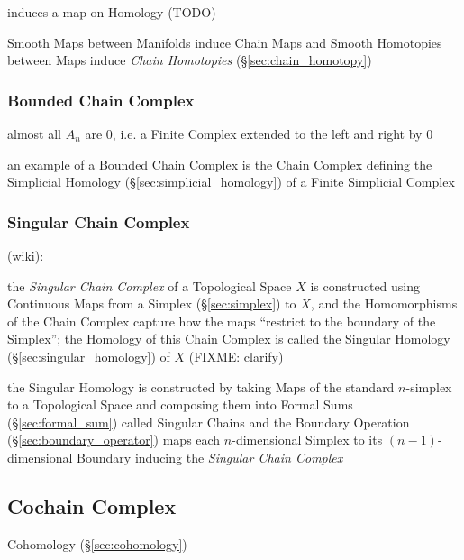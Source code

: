 induces a map on Homology (TODO)

Smooth Maps between Manifolds induce Chain Maps and Smooth Homotopies between
Maps induce \emph{Chain Homotopies} (\S\ref{sec:chain_homotopy})



\subsubsection{Bounded Chain Complex}\label{sec:bounded_chain_complex}

almost all $A_n$ are $0$, i.e. a Finite Complex extended to the left and right
by $0$

an example of a Bounded Chain Complex is the Chain Complex defining the
Simplicial Homology (\S\ref{sec:simplicial_homology}) of a Finite Simplicial
Complex



\subsubsection{Singular Chain Complex}\label{sec:singular_chain_complex}

(wiki):

the \emph{Singular Chain Complex} of a Topological Space $X$ is constructed
using Continuous Maps from a Simplex (\S\ref{sec:simplex}) to $X$, and the
Homomorphisms of the Chain Complex capture how the maps ``restrict to the
boundary of the Simplex''; the Homology of this Chain Complex is called the
Singular Homology (\S\ref{sec:singular_homology}) of $X$ (FIXME: clarify)

the Singular Homology is constructed by taking Maps of the standard $n$-simplex
to a Topological Space and composing them into Formal
Sums (\S\ref{sec:formal_sum}) called Singular Chains and the Boundary Operation
(\S\ref{sec:boundary_operator}) maps each $n$-dimensional Simplex to its
$(n-1)$-dimensional Boundary inducing the \emph{Singular Chain Complex}



\subsection{Cochain Complex}\label{sec:cochain_complex}

\fist Cohomology (\S\ref{sec:cohomology})

